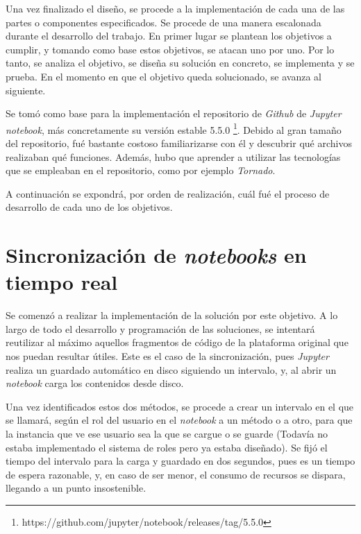 \documentclass[11pt,spanish,listoffigures,listoftables]{tfgetsinf}
\begin{document}
Una vez finalizado el diseño, se procede a la implementación de cada una de las partes o componentes especificados. Se procede de una manera escalonada durante el desarrollo del trabajo. En primer lugar se plantean los objetivos a cumplir, y tomando como base estos objetivos, se atacan uno por uno. Por lo tanto, se analiza el objetivo, se diseña su solución en concreto, se implementa y se prueba. En el momento en que el objetivo queda solucionado, se avanza al siguiente.

Se tomó como base para la implementación el repositorio de \textit{Github} de \textit{Jupyter notebook}, más concretamente su versión estable 5.5.0 \footnote{https://github.com/jupyter/notebook/releases/tag/5.5.0}. Debido al gran tamaño del repositorio, fué bastante costoso familiarizarse con él y descubrir qué archivos realizaban qué funciones. Además, hubo que aprender a utilizar las tecnologías que se empleaban en el repositorio, como por ejemplo \textit{Tornado}.

A continuación se expondrá, por orden de realización, cuál fué el proceso de desarrollo de cada uno de los objetivos.



\section{Sincronización de \textit{notebooks} en tiempo real}
\label{sec:desarrollo-sincro}

Se comenzó a realizar la implementación de la solución por este objetivo. A lo largo de todo el desarrollo y programación de las soluciones, se intentará reutilizar al máximo aquellos fragmentos de código de la plataforma original que nos puedan resultar útiles. Este es el caso de la sincronización, pues \textit{Jupyter} realiza un guardado automático en disco siguiendo un intervalo, y, al abrir un \textit{notebook} carga los contenidos desde disco.

Una vez identificados estos dos métodos, se procede a crear un intervalo en el que se llamará, según el rol del usuario en el \textit{notebook} a un método o a otro, para que la instancia que ve ese usuario sea la que se cargue o se guarde (Todavía no estaba implementado el sistema de roles pero ya estaba diseñado). Se fijó el tiempo del intervalo para la carga y guardado en dos segundos, pues es un tiempo de espera razonable, y, en caso de ser menor, el consumo de recursos se dispara, llegando a un punto insostenible.
\end{document}
